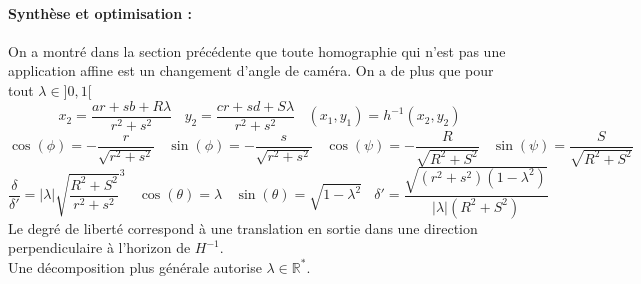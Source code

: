  \paragraph{Synthèse et optimisation :}
 On a montré dans la section précédente que toute homographie qui n'est pas une application affine est un changement d'angle de caméra. On a de plus que pour tout $\lambda \in ]0,1[$ %
 \begin{equation*}
x_2=\frac{ar+sb+R \lambda}{r^2 +s^2}~~~~y_2=\frac{cr+sd+S \lambda}{r^2 +s^2}~~~~(x_1 , y_1) = h^{-1}(x_{2},y_{2})
\end{equation*}
 \begin{equation*}
 \cos( \phi )= - \frac{r}{\sqrt{r^2 + s^2}}~~~~ \sin( \phi )= - \frac{s}{\sqrt{r^2 + s^2}}~~~~\cos( \psi ) =- \frac{R}{\sqrt{R^2 + S^2}}~~~~ \sin( \psi ) = \frac{S}{\sqrt{R^2 + S^2}}
 \end{equation*}
 \begin{equation*}
 \frac{\delta}{\delta'}=|\lambda|\sqrt{\frac{R^2 + S^2}{r^2 + s^2}}^{3}~~~~\cos(\theta)=\lambda~~~~\sin(\theta)=\sqrt{1-\lambda^2}~~~~\delta'=  \frac{\sqrt{(r^2 + s^2)(1-\lambda^2)}}{|\lambda| (R^2+S^2)}
 \end{equation*}
 Le degré de liberté correspond à une translation en sortie dans une direction perpendiculaire à l'horizon de $H^{-1}$.\\
 Une décomposition plus générale autorise $\lambda \in \mathbb{R}^{*}$.
